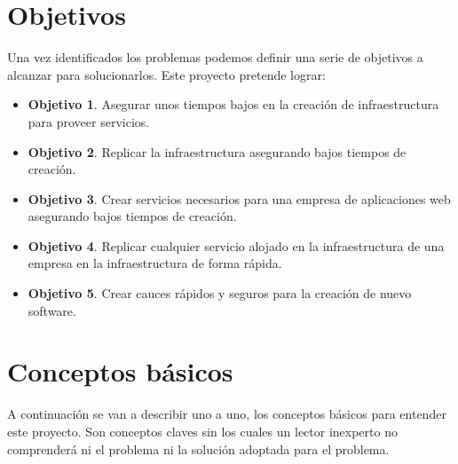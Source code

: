 \section{Objetivos}
\label{objetivos_primarios}
\begin{text}
	Una vez identificados los problemas podemos definir una serie de objetivos a alcanzar para solucionarlos. Este proyecto pretende lograr:
	\begin{itemize}
		\item \textbf{Objetivo 1}. Asegurar unos tiempos bajos en la creación de infraestructura para proveer servicios.
		\item \textbf{Objetivo 2}. Replicar la infraestructura asegurando bajos tiempos de creación.
		\item \textbf{Objetivo 3}. Crear servicios necesarios para una empresa de aplicaciones web asegurando bajos tiempos de creación.
		\item \textbf{Objetivo 4}. Replicar cualquier servicio alojado en la infraestructura de una empresa en la infraestructura de forma rápida.
		\item \textbf{Objetivo 5}. Crear cauces rápidos y seguros para la creación de nuevo software.
	\end{itemize}
\end{text}

\section{Conceptos básicos}
		\begin{text}
			A continuación se van a describir uno a uno, los conceptos básicos para entender este proyecto. Son conceptos claves sin los cuales un lector inexperto no comprenderá ni el problema ni la solución adoptada para el problema.
		\end{text}
